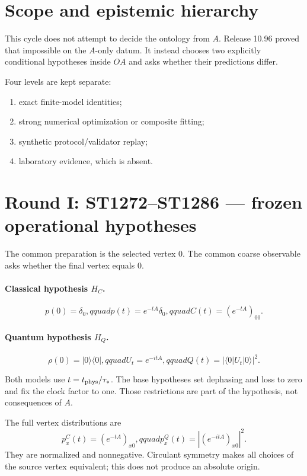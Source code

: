 \documentclass[11pt,a4paper]{article}
\begin{document}
\tableofcontents\newpage

\section{Scope and epistemic hierarchy}

This cycle does not attempt to decide the ontology from $A$.  Release 10.96
proved that impossible on the $A$-only datum.  It instead chooses two explicitly
conditional hypotheses inside $OA$ and asks whether their predictions differ.

Four levels are kept separate:
\begin{enumerate}
\item exact finite-model identities;
\item strong numerical optimization or composite fitting;
\item synthetic protocol/validator replay;
\item laboratory evidence, which is absent.
\end{enumerate}

\section{Round I: ST1272--ST1286 --- frozen operational hypotheses}

The common preparation is the selected vertex $0$.  The common coarse
observable asks whether the final vertex equals $0$.

\paragraph{Classical hypothesis $H_C$.}
\[
 p(0)=\delta_0,qquad p(t)=e^{-tA}\delta_0,qquad
 C(t)=(e^{-tA})_{00}.
\]

\paragraph{Quantum hypothesis $H_Q$.}
\[
 \rho(0)=|0\rangle\langle0|,qquad
 U_t=e^{-itA},qquad
 Q(t)=|\langle0|U_t|0\rangle|^2.
\]

Both models use $t=t_{\rm phys}/\tau_*$.  The base hypotheses set dephasing and
loss to zero and fix the clock factor to one.  Those restrictions are part of
the hypothesis, not consequences of $A$.

The full vertex distributions are
\[
 p_x^{C}(t)=(e^{-tA})_{x0},qquad
 p_x^{Q}(t)=|(e^{-itA})_{x0}|^2.
\]
They are normalized and nonnegative.  Circulant symmetry makes all choices of
the source vertex equivalent; this does not produce an absolute origin.
\end{document}
